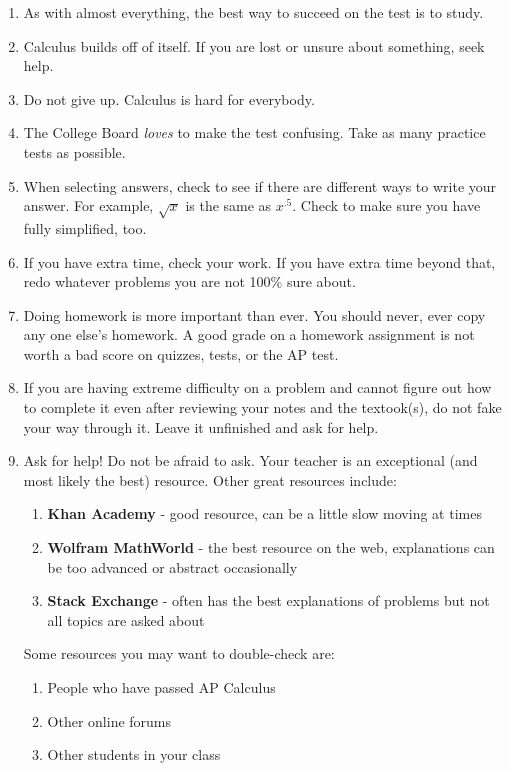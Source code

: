 \documentclass[../revisedmain.tex]{subfiles}
\begin{document}
	\begin{enumerate}
		\item As with almost everything, the best way to succeed on the test is to study.
		\item Calculus builds off of itself. If you are lost or unsure about something, seek help.
		\item Do not give up. Calculus is hard for everybody.
		\item The College Board \textit{loves} to make the test confusing. Take as many practice tests as possible.
		\item When selecting answers, check to see if there are different ways to write your answer. For example, \(\sqrt{x}\) is the same as \(x^{.5}\). Check to make sure you have fully simplified, too.
		\item If you have extra time, check your work. If you have extra time beyond that, redo whatever problems you are not 100\% sure about.
		\item Doing homework is more important than ever. You should never, ever copy any one else's homework. A good grade on a homework assignment is not worth a bad score on quizzes, tests, or the AP test.
		\item If you are having extreme difficulty on a problem and cannot figure out how to complete it even after reviewing your notes and the textook(s), do not fake your way through it. Leave it unfinished and ask for help.
		\item Ask for help! Do not be afraid to ask. Your teacher is an exceptional (and most likely the best) resource. Other great resources include:
		\begin{enumerate}
			\item \textbf{Khan Academy} - good resource, can be a little slow moving at times
			\item \textbf{Wolfram MathWorld} - the best resource on the web, explanations can be too advanced or abstract occasionally
			\item \textbf{Stack Exchange} - often has the best explanations of problems but not all topics are asked about
		\end{enumerate}
		Some resources you may want to double-check are:
		\begin{enumerate}
			\item People who have passed AP Calculus
			\item Other online forums
			\item Other students in your class
		\end{enumerate}
	\end{enumerate}
\end{document}
